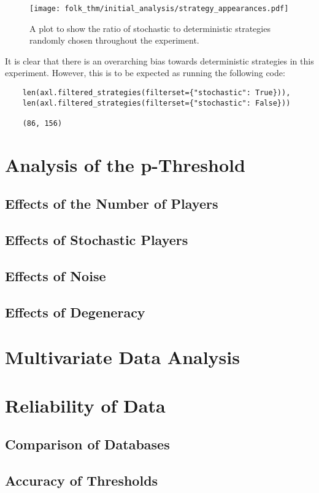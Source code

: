 \begin{figure}
    \centering
    \texttt{[image: folk\_thm/initial\_analysis/strategy\_appearances.pdf]}
    \caption{A plot to show the ratio of stochastic to deterministic strategies randomly chosen throughout the experiment.}\label{fig:stochastic_chart}
\end{figure}

It is clear that there is an overarching bias towards deterministic strategies
in this experiment. However, this is to be expected as running the following
code:

\begin{verbatim}
    len(axl.filtered_strategies(filterset={"stochastic": True})), 
    len(axl.filtered_strategies(filterset={"stochastic": False}))

    (86, 156)
\end{verbatim}

\section{Analysis of the p-Threshold}\label{sec:Analysis_of_the_p-Threshold}

\subsection{Effects of the Number of Players}\label{subsec:Effects_of_the_number_of_Players}

\subsection{Effects of Stochastic Players}\label{subsec:Effects_of_Stochastic_Players}

\subsection{Effects of Noise}\label{subsec:Effects_of_Noise}

\subsection{Effects of Degeneracy}\label{subsec:Effects_of_Degeneracy}

\section{Multivariate Data Analysis}\label{sec:MV_Data_Analysis}

\section{Reliability of Data}\label{sec:Reliability_of_Data}

\subsection{Comparison of Databases}\label{subsec:Comparison_of_Databases}

\subsection{Accuracy of Thresholds}\label{subsec:Accuracy_of_Thresholds}